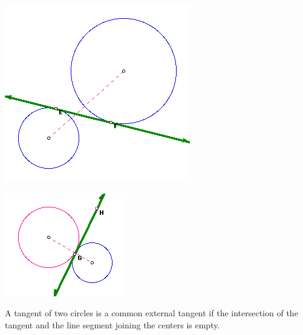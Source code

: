     \begin{center}
    \begin{minipage}{.5\textwidth}
    \centering
    \includegraphics[scale = 0.5]{imgs/internal1.png}
    \end{minipage}%
    \begin{minipage}{0.5\textwidth}
    \centering
    \includegraphics[scale = 0.5]{imgs/internal2.png}
    \end{minipage}
    \end{center}
    
    
    A tangent of two circles is a common external tangent if the intersection of the tangent and the line segment joining the centers is empty.

